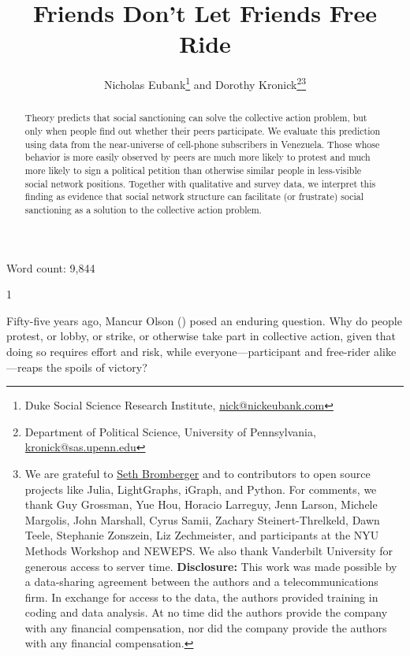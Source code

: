 \documentclass[12pt]{article}
\title{Friends Don't Let Friends Free Ride}
\author{Nicholas Eubank\footnote{\scriptsize Duke Social Science Research Institute, \href{mailto:nick@nickeubank.com}{nick@nickeubank.com}}\: and Dorothy Kronick\footnote{\scriptsize Department of Political Science, University of Pennsylvania, \href{mailto:kronick@sas.upenn.edu}{kronick@sas.upenn.edu}}\footnote{\scriptsize We are grateful to \href{https://github.com/sbromberger}{Seth Bromberger} and to contributors to open source projects like Julia, LightGraphs, iGraph, and Python. For comments, we thank Guy Grossman, Yue Hou, Horacio Larreguy, Jenn Larson, Michele Margolis, John Marshall, Cyrus Samii, Zachary Steinert-Threlkeld, Dawn Teele, Stephanie Zonszein, Liz Zechmeister, and participants at the NYU Methods Workshop and NEWEPS. We also thank Vanderbilt University for generous access to server time. \scriptsize \textbf{Disclosure:} This work was made possible by a data-sharing agreement between the authors and a telecommunications firm. In exchange for access to the data, the authors provided training in coding and data analysis. At no time did the authors provide the company with any financial compensation, nor did the company provide the authors with any financial compensation.}}
\newcommand{\jop}{0} %
\begin{document}
\maketitle


\vspace{1cm}
\begin{abstract}
\noindent Theory predicts that social sanctioning can solve the collective action problem, but only when people find out whether their peers participate. We evaluate this prediction using data from the near-universe of cell-phone subscribers in Venezuela. Those whose behavior is more easily observed by peers are much more likely to protest and much more likely to sign a political petition than otherwise similar people in less-visible social network positions. Together with qualitative and survey data, we interpret this finding as evidence that social network structure can facilitate (or frustrate) social sanctioning as a solution to the collective action problem.
\end{abstract}

\begin{center}
Word count: 9,844
\end{center}
\thispagestyle{empty}



\doparttoc
\dopartlof
\dopartlot
\faketableofcontents
\fakelistoffigures
\fakelistoftables



\pagebreak












\setcounter{page}{1}

\if\jop1

\linespread{2}\selectfont

\fi

Fifty-five years ago, Mancur Olson (\citeyear{OlsonBook}) posed an enduring question. Why do people protest, or lobby, or strike, or otherwise take part in collective action, given that doing so requires effort and risk, while everyone---participant and free-rider alike---reaps the spoils of victory?
\end{document}

